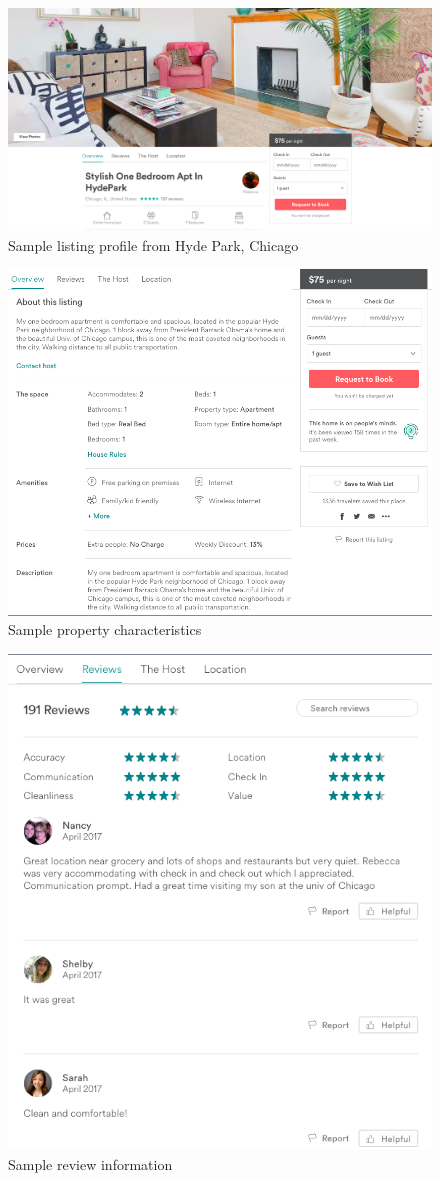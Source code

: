 \begin{figure}
\includegraphics[width=.9\textwidth]{figures/sample1-cover}
\caption{Sample listing profile from Hyde Park, Chicago}
\end{figure}
\begin{figure}
\includegraphics[width=.9\textwidth]{figures/sample2-property}
\caption{Sample property characteristics}
\end{figure}
\begin{figure}
\includegraphics[width=.8\textwidth]{figures/sample3-reviews}
\caption{Sample review information}
\end{figure}
